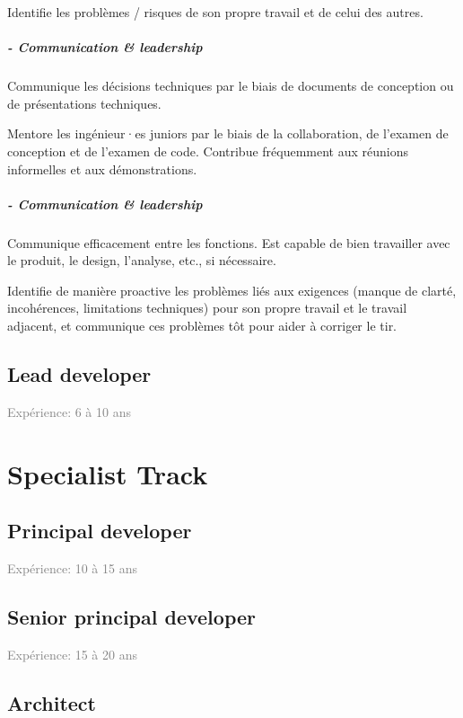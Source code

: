 \documentclass[a4paper, french, openany, 12pt]{book}
\newcommand\cha{\textcolor{RawSienna}{\textbf{\bsc{Charisma} - Communication \& leadership}}}
\newcommand\xp[1]{\textcolor{Gray}{Expérience: {#1} ans}}
\begin{document}
Identifie les problèmes / risques de son propre travail et de celui des autres.

\subsubsection*{\cha}

Communique les décisions techniques par le biais de documents de conception ou de présentations techniques.

Mentore les ingénieur·es juniors par le biais de la collaboration, de l'examen de conception et de l'examen de code. 
Contribue fréquemment aux réunions informelles et aux démonstrations.

\subsubsection*{\cha}

Communique efficacement entre les fonctions.
Est capable de bien travailler avec le produit, le design, l'analyse, etc., si nécessaire.

Identifie de manière proactive les problèmes liés aux exigences (manque de clarté, incohérences, limitations techniques)
pour son propre travail et le travail adjacent, et communique ces problèmes tôt pour aider à corriger le tir.

\chapter{Lead developer}

\xp{6 à 10}

\part{Specialist Track}

\chapter{Principal developer}

\xp{10 à 15}

\chapter{Senior principal developer}

\xp{15 à 20}

\chapter{Architect}
\end{document}
